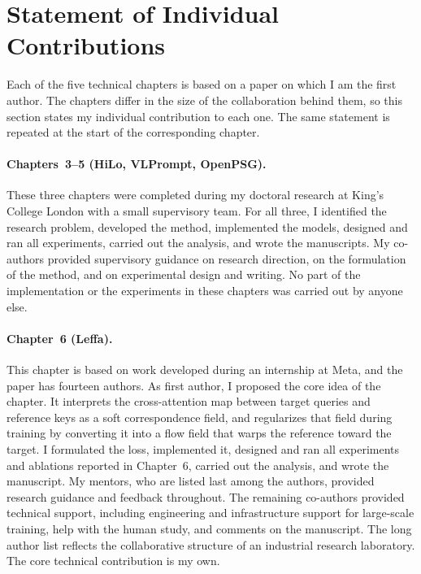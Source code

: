 \section{Statement of Individual Contributions}
\label{sec:individual_contributions}
Each of the five technical chapters is based on a paper on which I am the first author. The chapters differ in the size of the collaboration behind them, so this section states my individual contribution to each one. The same statement is repeated at the start of the corresponding chapter.

\paragraph{Chapters~3--5 (HiLo, VLPrompt, OpenPSG).}
These three chapters were completed during my doctoral research at King's College London with a small supervisory team. For all three, I identified the research problem, developed the method, implemented the models, designed and ran all experiments, carried out the analysis, and wrote the manuscripts. My co-authors provided supervisory guidance on research direction, on the formulation of the method, and on experimental design and writing. No part of the implementation or the experiments in these chapters was carried out by anyone else.

\paragraph{Chapter~6 (Leffa).}
This chapter is based on work developed during an internship at Meta, and the paper has fourteen authors. As first author, I proposed the core idea of the chapter. It interprets the cross-attention map between target queries and reference keys as a soft correspondence field, and regularizes that field during training by converting it into a flow field that warps the reference toward the target. I formulated the \leffa{} loss, implemented it, designed and ran all experiments and ablations reported in Chapter~6, carried out the analysis, and wrote the manuscript. My mentors, who are listed last among the authors, provided research guidance and feedback throughout. The remaining co-authors provided technical support, including engineering and infrastructure support for large-scale training, help with the human study, and comments on the manuscript. The long author list reflects the collaborative structure of an industrial research laboratory. The core technical contribution is my own.

